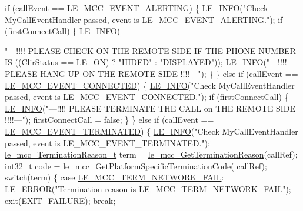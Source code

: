 \begin{DoxyCodeInclude}
{    \textcolor{keywordflow}{if} (callEvent == \hyperlink{le__mcc__interface_8h_aefc4679ffa76d0e04c578572c22f06cfa05261a9fdb7ee59a0dae1cc27bb30e07}{LE\_MCC\_EVENT\_ALERTING})
    \{
        \hyperlink{le__log_8h_a23e6d206faa64f612045d688cdde5808}{LE\_INFO}(\textcolor{stringliteral}{"Check MyCallEventHandler passed, event is LE\_MCC\_EVENT\_ALERTING."});
        \textcolor{keywordflow}{if} (firstConnectCall)
        \{
            \hyperlink{le__log_8h_a23e6d206faa64f612045d688cdde5808}{LE\_INFO}(\textcolor{stringliteral}{"---!!!! PLEASE CHECK ON THE REMOTE SIDE IF THE PHONE NUMBER IS %
                            ((ClirStatus == LE\_ON) ? \textcolor{stringliteral}{"HIDED"} : \textcolor{stringliteral}{"DISPLAYED"}));
            \hyperlink{le__log_8h_a23e6d206faa64f612045d688cdde5808}{LE\_INFO}(\textcolor{stringliteral}{"---!!!! PLEASE HANG UP ON THE REMOTE SIDE !!!!---"});
        \}
    \}
    \textcolor{keywordflow}{else} \textcolor{keywordflow}{if} (callEvent == \hyperlink{le__mcc__interface_8h_aefc4679ffa76d0e04c578572c22f06cfa86702531207c50314b10ae3278c7ca0d}{LE\_MCC\_EVENT\_CONNECTED})
    \{
        \hyperlink{le__log_8h_a23e6d206faa64f612045d688cdde5808}{LE\_INFO}(\textcolor{stringliteral}{"Check MyCallEventHandler passed, event is LE\_MCC\_EVENT\_CONNECTED."});
        \textcolor{keywordflow}{if} (firstConnectCall)
        \{
            \hyperlink{le__log_8h_a23e6d206faa64f612045d688cdde5808}{LE\_INFO}(\textcolor{stringliteral}{"---!!!! PLEASE TERMINATE THE CALL on THE REMOTE SIDE !!!!---"});
            firstConnectCall = \textcolor{keyword}{false};
        \}
    \}
    \textcolor{keywordflow}{else} \textcolor{keywordflow}{if} (callEvent == \hyperlink{le__mcc__interface_8h_aefc4679ffa76d0e04c578572c22f06cfa38b7c4ab21fa9828be8169372e41ae98}{LE\_MCC\_EVENT\_TERMINATED})
    \{
        \hyperlink{le__log_8h_a23e6d206faa64f612045d688cdde5808}{LE\_INFO}(\textcolor{stringliteral}{"Check MyCallEventHandler passed, event is LE\_MCC\_EVENT\_TERMINATED."});
        \hyperlink{le__mcc__interface_8h_abda706f723ba619f9bc460bcc9a4960d}{le\_mcc\_TerminationReason\_t} term = 
      \hyperlink{le__mcc__interface_8h_ab16921abc02e0569b129f4a7d92bf3c9}{le\_mcc\_GetTerminationReason}(callRef);
        int32\_t code = \hyperlink{le__mcc__interface_8h_a68b9b8ed1b221924dcea1be0fd610a54}{le\_mcc\_GetPlatformSpecificTerminationCode}(
      callRef);
        \textcolor{keywordflow}{switch}(term)
        \{
            \textcolor{keywordflow}{case} \hyperlink{le__mcc__interface_8h_abda706f723ba619f9bc460bcc9a4960da2ef2a4a77e51faec38a2c131ff5d6f24}{LE\_MCC\_TERM\_NETWORK\_FAIL}:
                \hyperlink{le__log_8h_a353590f91b3143a7ba3a416ae5a50c3d}{LE\_ERROR}(\textcolor{stringliteral}{"Termination reason is LE\_MCC\_TERM\_NETWORK\_FAIL"});
                exit(EXIT\_FAILURE);
                \textcolor{keywordflow}{break};

}}
\end{DoxyCodeInclude}
